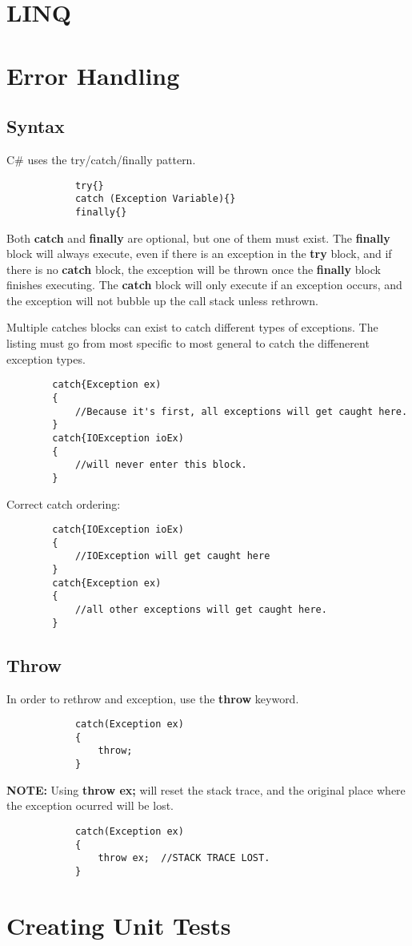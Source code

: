 \documentclass {amsart}
\begin{document}
\section{LINQ}

\section{Error Handling}
	\subsection{Syntax}  C\# uses the try/catch/finally pattern.
		\begin{lstlisting}
			try{}
			catch (Exception Variable){}
			finally{}
		\end{lstlisting}
	Both {\bf catch} and {\bf finally} are optional, but one of them must exist.  The {\bf finally} block will always execute, even if there is an exception in the {\bf try} block, and if there is no {\bf catch} block, the exception will be thrown once the {\bf finally} block finishes executing.  The {\bf catch} block will only execute if an exception occurs, and the exception will not bubble up the call stack unless rethrown.  
		
	Multiple catches blocks can exist to catch different types of exceptions.  The listing must go from most specific to most general to catch the diffenerent exception types. 

	\begin{lstlisting}
		catch{Exception ex)
		{
			//Because it's first, all exceptions will get caught here.
		}
		catch{IOException ioEx)
		{
			//will never enter this block. 
		}
	\end{lstlisting}
	
	Correct catch ordering:

	\begin{lstlisting}
		catch{IOException ioEx)
		{
			//IOException will get caught here
		}
		catch{Exception ex)
		{
			//all other exceptions will get caught here.
		}
	\end{lstlisting}
	\subsection{Throw}  In order to rethrow and exception, use the {\bf throw} keyword.  
		\begin{lstlisting}
			catch(Exception ex)
			{
				throw;
			}
		\end{lstlisting}
	{\bf NOTE:} Using {\bf throw ex;} will reset the stack trace, and the original place where the exception ocurred will be lost.
		\begin{lstlisting}
			catch(Exception ex)
			{
				throw ex;  //STACK TRACE LOST.
			}
		\end{lstlisting}
		

\section{Creating Unit Tests}
\end{document}
